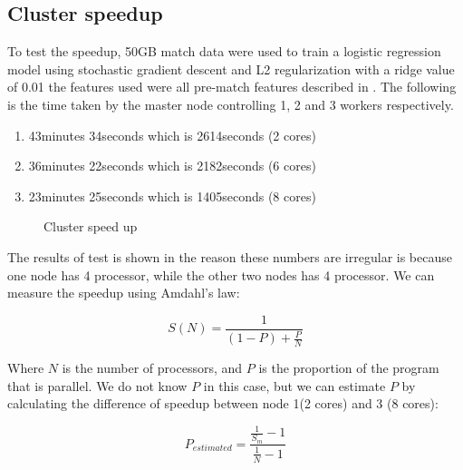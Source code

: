 \subsection{Cluster speedup}\label{sec:speedup}
To test the speedup, 50GB match data were used to train a logistic regression model using stochastic gradient descent and L2 regularization with a ridge value of 0.01 the features used were all pre-match features described in . The following is the time taken by the master node controlling 1, 2 and 3 workers respectively.

\begin{enumerate}
    \item 43minutes 34seconds which is 2614seconds (2 cores)
    \item 36minutes 22seconds which is 2182seconds (6 cores)
    \item 23minutes 25seconds which is 1405seconds (8 cores)
\end{enumerate}

\begin{figure}[!htb]
  \centering
   \caption{Cluster speed up}\label{fig:cluster-speedup}
\end{figure}
The results of test is shown in  the reason these numbers are irregular is because one node has 4 processor, while the other two nodes has 4 processor. We can measure the speedup using Amdahl's law:

\[S(N) = \frac{1}{(1-P)+\frac{P}{N}}\]

Where $N$ is the number of processors, and $P$ is the proportion of the program that is parallel. We do not know $P$ in this case, but we can estimate $P$ by calculating the difference of speedup between node 1(2 cores) and 3 (8 cores):

\[P_{estimated} = \frac{\frac{1}{S_m}-1}{\frac{1}{N}-1}  \]

